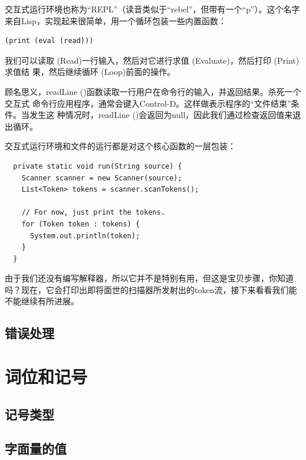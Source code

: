 \documentclass[cn,10pt,math=newtx,citestyle=gb7714-2015,bibstyle=gb7714-2015]{elegantbook}
\newenvironment{code}{\captionsetup{type=listing}}{}
\begin{document}
\begin{tcolorbox}
交互式运行环境也称为“REPL”（读音类似于“rebel”，但带有一个“p”）。这个名字来自Lisp，实现起来很简单，用一个循环包装一些内置函数：

\begin{verbatim}
(print (eval (read)))
\end{verbatim}

我们可以读取 (Read)一行输入，然后对它进行求值 (Evaluate)，然后打印 (Print)求值结
果，然后继续循环 (Loop)前面的操作。
\end{tcolorbox}

顾名思义，readLine ()函数读取一行用户在命令行的输入，并返回结果。杀死一个交互式
命令行应用程序，通常会键入Control-D。这样做表示程序的“文件结束”条件。当发生这
种情况时，readLine ()会返回为null，因此我们通过检查返回值来退出循环。

交互式运行环境和文件的运行都是对这个核心函数的一层包装：

\begin{code}
\begin{verbatim}
  private static void run(String source) {
    Scanner scanner = new Scanner(source);
    List<Token> tokens = scanner.scanTokens();

    // For now, just print the tokens.
    for (Token token : tokens) {
      System.out.println(token);
    }
  }
\end{verbatim}
\end{code}

由于我们还没有编写解释器，所以它并不是特别有用，但这是宝贝步骤，你知道吗？现在，它会打印出即将面世的扫描器所发射出的token流，接下来看看我们能不能继续有所进展。

\subsection{错误处理}

\section{词位和记号}

\subsection{记号类型}

\subsection{字面量的值}
\end{document}
